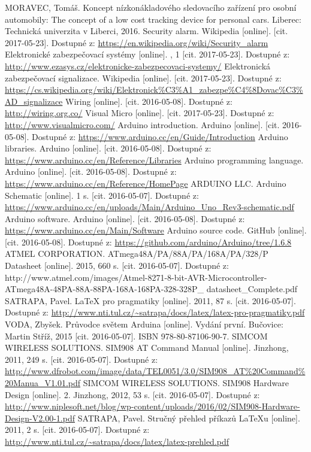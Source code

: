 \documentclass[FM,MP]{tulthesis}  %
\begin{document}
\begin{thebibliography}{10}
MORAVEC, Tomáš. Koncept nízkonákladového sledovacího zařízení pro osobní automobily: The concept of a low cost tracking device for personal cars. Liberec: Technická univerzita v Liberci, 2016.
Security alarm. Wikipedia [online]. [cit. 2017-05-23]. Dostupné z: \url{https://en.wikipedia.org/wiki/Security_alarm}
Elektronické zabezpečovací systémy [online]. , 1 [cit. 2017-05-23]. Dostupné z: \url{http://www.ezasys.cz/elektronicke-zabezpecovaci-systemy/}
Elektronická zabezpečovací signalizace. Wikipedia [online]. [cit. 2017-05-23]. Dostupné z: \url{https://cs.wikipedia.org/wiki/Elektronick\%C3\%A1\_zabezpe\%C4\%8Dovac\%C3\%AD_signalizace}
Wiring [online]. [cit. 2016-05-08]. Dostupné z: \url{http://wiring.org.co/}
Visual Micro [online]. [cit. 2017-05-23]. Dostupné z: \url{http://www.visualmicro.com/}
Arduino introduction. Arduino [online]. [cit. 2016-05-08]. Dostupné z: \url{https://www.arduino.cc/en/Guide/Introduction}
Arduino libraries. Arduino [online]. [cit. 2016-05-08]. Dostupné z: \url{https://www.arduino.cc/en/Reference/Libraries}
Arduino programming language. Arduino [online]. [cit. 2016-05-08]. Dostupné z: \url{https://www.arduino.cc/en/Reference/HomePage}
ARDUINO LLC. Arduino Schematic [online]. 1 s. [cit. 2016-05-07]. Dostupné z: \url{https://www.arduino.cc/en/uploads/Main/Arduino\_Uno\_Rev3-schematic.pdf}
 Arduino software. Arduino [online]. [cit. 2016-05-08]. Dostupné z: \url{https://www.arduino.cc/en/Main/Software}
Arduino source code. GitHub [online]. [cit. 2016-05-08]. Dostupné z: \url{https://github.com/arduino/Arduino/tree/1.6.8}
ATMEL CORPORATION. ATmega48A/PA/88A/PA/168A/PA/328/P Datasheet [online]. 2015, 660 s. [cit. 2016-05-07]. Dostupné z: http://www.atmel.com/images/Atmel-8271-8-bit-AVR-Microcontroller-ATmega48A-48PA-88A-88PA-168A-168PA-328-328P\_ datasheet\_Complete.pdf
SATRAPA, Pavel. LaTeX pro pragmatiky [online]. 2011, 87 s. [cit. 2016-05-07]. Dostupné z: \url{http://www.nti.tul.cz/~satrapa/docs/latex/latex-pro-pragmatiky.pdf}
VODA, Zbyšek. Průvodce světem Arduina [online]. Vydání první. Bučovice: Martin Stříž, 2015 [cit. 2016-05-07]. ISBN 978-80-87106-90-7.
SIMCOM WIRELESS SOLUTIONS. SIM908 AT Command Manual [online]. Jinzhong, 2011, 249 s. [cit. 2016-05-07]. Dostupné z: \url{http://www.dfrobot.com/image/data/TEL0051/3.0/SIM908\_AT\%20Command\%20Manua\_V1.01.pdf}
SIMCOM WIRELESS SOLUTIONS. SIM908 Hardware Design [online]. 2. Jinzhong, 2012, 53 s. [cit. 2016-05-07]. Dostupné z: \url{http://www.niplesoft.net/blog/wp-content/uploads/2016/02/SIM908-Hardware-Design-V2.00-1.pdf}
SATRAPA, Pavel. Stručný přehled příkazů LaTeXu [online]. 2011, 2 s. [cit. 2016-05-07]. Dostupné z: \url{http://www.nti.tul.cz/~satrapa/docs/latex/latex-prehled.pdf}
\end{thebibliography}
\end{document}
